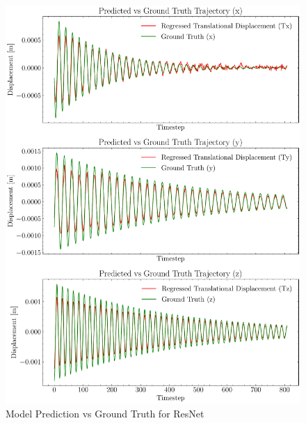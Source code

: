 \begin{figure}[H]
    \centering
    \includegraphics[scale=0.6]{images/fig_chapter4/nn_related/predicted_vs_ground_truth_resnet.pdf}
    \caption{Model Prediction vs Ground Truth for ResNet}
    \label{fig:resnet_op_vs_gt}
\end{figure}

